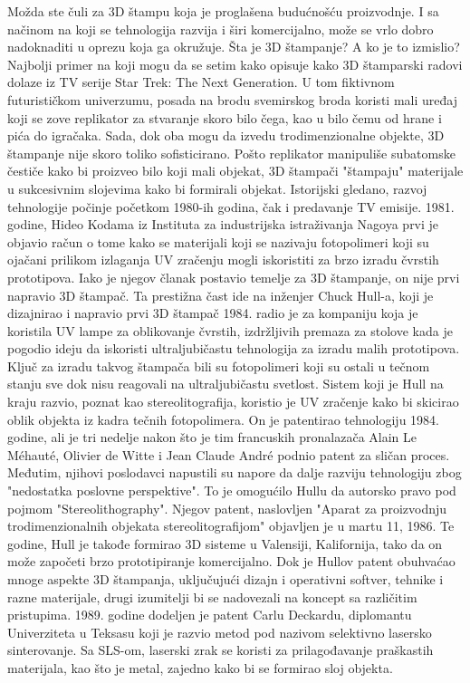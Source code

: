 \documentclass[a4paper]{article}
\begin{document}
{\bigbreak Možda ste čuli za 3D štampu koja je proglašena budućnošću proizvodnje. I sa načinom na koji se tehnologija razvija i širi komercijalno, može se vrlo dobro nadoknaditi u oprezu koja ga okružuje. Šta je 3D štampanje? A ko je to izmislio? 
\bigbreak Najbolji primer na koji mogu da se setim kako opisuje kako 3D štamparski radovi dolaze iz TV serije Star Trek: The Next Generation. U tom fiktivnom futurističkom univerzumu, posada na brodu svemirskog broda koristi mali uređaj koji se zove replikator za stvaranje skoro bilo čega, kao u bilo čemu od hrane i pića do igračaka. 
\bigbreak Sada, dok oba mogu da izvedu trodimenzionalne objekte, 3D štampanje nije skoro toliko sofisticirano. Pošto replikator manipuliše subatomske čestiče kako bi proizveo bilo koji mali objekat, 3D štampači "štampaju" materijale u sukcesivnim slojevima kako bi formirali objekat. 
\bigbreak Istorijski gledano, razvoj tehnologije počinje početkom 1980-ih godina, čak i predavanje TV emisije. 1981. godine, Hideo Kodama iz Instituta za industrijska istraživanja Nagoya prvi je objavio račun o tome kako se materijali koji se nazivaju fotopolimeri koji su ojačani prilikom izlaganja UV zračenju mogli iskoristiti za brzo izradu čvrstih prototipova. Iako je njegov članak postavio temelje za 3D štampanje, on nije prvi napravio 3D štampač. 
\bigbreak Ta prestižna čast ide na inženjer Chuck Hull-a, koji je dizajnirao i napravio prvi 3D štampač 1984. radio je za kompaniju koja je koristila UV lampe za oblikovanje čvrstih, izdržljivih premaza za stolove kada je pogodio ideju da iskoristi ultraljubičastu tehnologija za izradu malih prototipova. 
\bigbreak Ključ za izradu takvog štampača bili su fotopolimeri koji su ostali u tečnom stanju sve dok nisu reagovali na ultraljubičastu svetlost. Sistem koji je Hull na kraju razvio, poznat kao stereolitografija, koristio je UV zračenje kako bi skicirao oblik objekta iz kadra tečnih fotopolimera. 
\bigbreak On je patentirao tehnologiju 1984. godine, ali je tri nedelje nakon što je tim francuskih pronalazača Alain Le Méhauté, Olivier de Witte i Jean Claude André podnio patent za sličan proces. Međutim, njihovi poslodavci napustili su napore da dalje razviju tehnologiju zbog "nedostatka poslovne perspektive". To je omogućilo Hullu da autorsko pravo pod pojmom "Stereolithography". Njegov patent, naslovljen "Aparat za proizvodnju trodimenzionalnih objekata stereolitografijom" objavljen je u martu 11, 1986. Te godine, Hull je takođe formirao 3D sisteme u Valensiji, Kalifornija, tako da on može započeti brzo prototipiranje komercijalno. 
Dok je Hullov patent obuhvaćao mnoge aspekte 3D štampanja, uključujući dizajn i operativni softver, tehnike i razne materijale, drugi izumitelji bi se nadovezali na koncept sa različitim pristupima. 1989. godine dodeljen je patent Carlu Deckardu, diplomantu Univerziteta u Teksasu koji je razvio metod pod nazivom selektivno lasersko sinterovanje. Sa SLS-om, laserski zrak se koristi za prilagođavanje praškastih materijala, kao što je metal, zajedno kako bi se formirao sloj objekta. 
}
\end{document}
